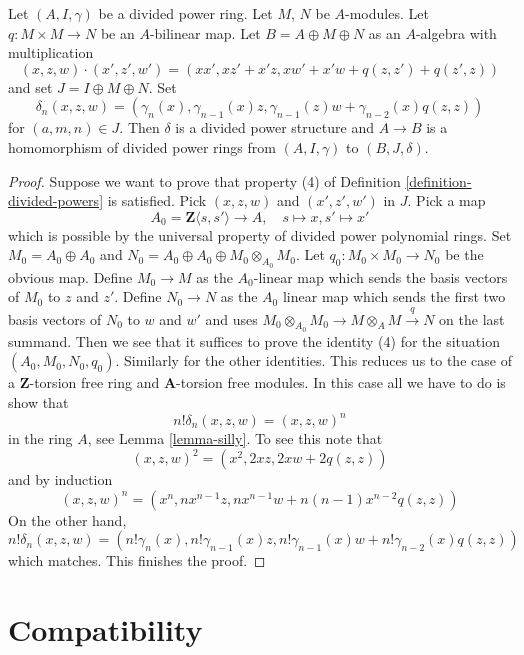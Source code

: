 \begin{lemma}
\label{lemma-divided-power-second-order-thickening}
Let $(A, I, \gamma)$ be a divided power ring. Let $M$, $N$ be $A$-modules.
Let $q : M \times M \to N$ be an $A$-bilinear map.
Let $B = A \oplus M \oplus N$ as an $A$-algebra with multiplication
$$
(x, z, w)\cdot (x', z', w') = (xx', xz' + x'z, xw' + x'w + q(z, z') + q(z', z))
$$
and set $J = I \oplus M \oplus N$. Set
$$
\delta_n(x, z, w) = (\gamma_n(x), \gamma_{n - 1}(x)z,
\gamma_{n - 1}(z)w + \gamma_{n - 2}(x)q(z, z))
$$
for $(a, m, n) \in J$.
Then $\delta$ is a divided power structure and
$A \to B$ is a homomorphism of divided power rings from
$(A, I, \gamma)$ to $(B, J, \delta)$.
\end{lemma}

\begin{proof}
Suppose we want to prove that property (4) of
Definition \ref{definition-divided-powers}
is satisfied. Pick $(x, z, w)$ and $(x', z', w')$ in $J$.
Pick a map
$$
A_0 = \mathbf{Z}\langle s, s'\rangle \longrightarrow A,\quad
s \longmapsto x,
s' \longmapsto x'
$$
which is possible by the universal property of divided power
polynomial rings. Set $M_0 = A_0 \oplus A_0$ and
$N_0 = A_0 \oplus A_0 \oplus M_0 \otimes_{A_0} M_0$.
Let $q_0 : M_0 \times M_0 \to N_0$ be the obvious map.
Define $M_0 \to M$ as the $A_0$-linear map which sends
the basis vectors of $M_0$ to $z$ and $z'$. Define $N_0 \to N$
as the $A_0$ linear map which sends the first two basis vectors
of $N_0$ to $w$ and $w'$ and uses
$M_0 \otimes_{A_0} M_0 \to M \otimes_A M \xrightarrow{q} N$
on the last summand. Then we see that it suffices to prove the
identity (4) for the situation $(A_0, M_0, N_0, q_0)$.
Similarly for the other identities. This reduces us to the case
of a $\mathbf{Z}$-torsion free ring and $\mathbf{A}$-torsion free modules.
In this case all we have to do is show that
$$
n! \delta_n(x, z, w) = (x, z, w)^n
$$
in the ring $A$, see Lemma \ref{lemma-silly}. To see this note that
$$
(x, z, w)^2 = (x^2, 2xz, 2xw + 2q(z, z))
$$
and by induction
$$
(x, z, w)^n = (x^n, nx^{n - 1}z, nx^{n - 1}w + n(n - 1)x^{n - 2}q(z, z))
$$
On the other hand,
$$
n! \delta_n(x, z, w) = (n!\gamma_n(x), n!\gamma_{n - 1}(x)z,
n!\gamma_{n - 1}(x)w + n!\gamma_{n - 2}(x) q(z, z))
$$
which matches. This finishes the proof.
\end{proof}




\section{Compatibility}
\label{section-compatibility}

